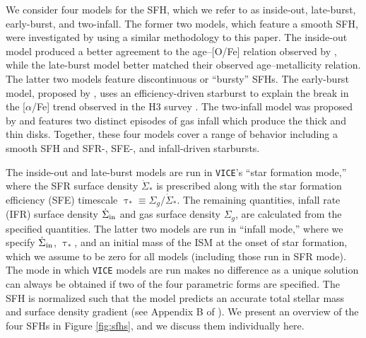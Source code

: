\documentclass[twocolumn,twocolappendix,linenumbers,trackchanges]{aastex631}
\newcommand{\aFe}{[$\alpha$/Fe]\xspace}
\newcommand{\vice}{{\tt VICE}\xspace}
\begin{document}
We consider four models for the SFH, which we refer to as inside-out, late-burst, early-burst, and two-infall. 
The former two models, which feature a smooth SFH, were investigated by  using a similar methodology to this paper. The inside-out model produced a better agreement to the age--[O/Fe] relation observed by \citet{Feuillet2019-MilkyWayAges}, while the late-burst model better matched their observed age--metallicity relation. 
The latter two models feature discontinuous or ``bursty'' SFHs. The early-burst model, proposed by \citet{Conroy2022-ThickDisk}, uses an efficiency-driven starburst to explain the break in the \aFe trend observed in the H3 survey \citep{Conroy2019-H3Survey}.
The two-infall model was proposed by \citet{Chiappini1997-TwoInfall} and features two distinct episodes of gas infall which produce the thick and thin disks.
Together, these four models cover a range of behavior including a smooth SFH and SFR-, SFE-, and infall-driven starbursts.

The inside-out and late-burst models
are run in \vice's ``star formation mode,'' where the SFR surface density $\dot\Sigma_*$ is prescribed along with the star formation efficiency (SFE) timescale $\uptau_*\equiv \Sigma_g/\dot\Sigma_*$. The remaining quantities, infall rate (IFR) surface density $\dot\Sigma_{\rm in}$ and gas surface density $\Sigma_g$, are calculated from the specified quantities. The latter two models are run in ``infall mode,'' where we specify $\dot\Sigma_{\rm in}$, $\uptau_*$, and an initial mass of the ISM at the onset of star formation, which we assume to be zero for all models (including those run in SFR mode). The mode in which \vice models are run makes no difference as a unique solution can always be obtained if two of the four parametric forms are specified. 
The SFH is normalized such that the model predicts an accurate total stellar mass and surface density gradient (see Appendix B of ).
We present an overview of the four SFHs in Figure \ref{fig:sfhs}, and we discuss them individually here.
\end{document}
